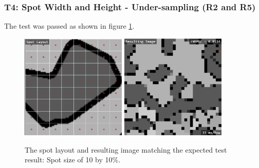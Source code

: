 \documentclass[12pt, titlepage]{article}
\begin{document}
\subsubsection{T4: Spot Width and Height - Under-sampling (R2 and R5)}
The test was passed as shown in figure \ref{fig_t4}.
\begin{figure}[h!]
  \begin{center}
   \includegraphics[width=5cm]{t4a.png}
   \includegraphics[width=5cm]{t4b.png}
  \caption{The spot layout and resulting image matching the expected test result:
  Spot size of 10 by 10\%.}
  \label{fig_t4} 
  \end{center}
\end{figure}
\end{document}
